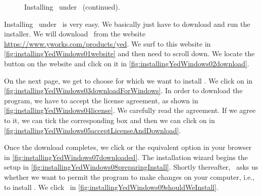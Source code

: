\begin{figure}%
\ContinuedFloat%
\centering%
%
%
%
\floatSep%
%
%
%
\floatRowSep%
%
%
%
\floatSep%
%
%
%
\floatRowSep%
%
%
%
\floatSep%
%
%
%
\caption{Installing \yEd\ under \microsoftWindows~(continued).}%
\label{fig:installingYedWindows:C}%
\end{figure}%
%
Installing \yEd\ under \microsoftWindows\ is very easy.
We basically just have to download and run the installer.
We will download \yEd\ from the website \url{https://www.yworks.com/products/yed}.
We surf to this website in \cref{fig:installingYedWindows01website} and then need to scroll down.
We locate the  button on the website and click on it in \cref{fig:installingYedWindows02download}.

On the next page, we get to choose for which  we want to install \yEd.
We click on  in \cref{fig:installingYedWindows03downloadForWindows}.
In order to download the program, we have to accept the license agreement, as shown in \cref{fig:installingYedWindows04license}.
We carefully read the agreement.
If we agree to it, we can tick the corresponding box and then we can click on  in \cref{fig:installingYedWindows05acceptLicenseAndDownload}.

Once the download completes, we click  or the equivalent option in your browser in \cref{fig:installingYedWindows07downloaded}.
The installation wizard begins the setup in \cref{fig:installingYedWindows08preparingInstall}.
Shortly thereafter, \microsoftWindows\ asks us whether we want to permit the program to make changes on your computer, i.e., to install \yEd.
We click~ in \cref{fig:installingYedWindows09shouldWeInstall}.

